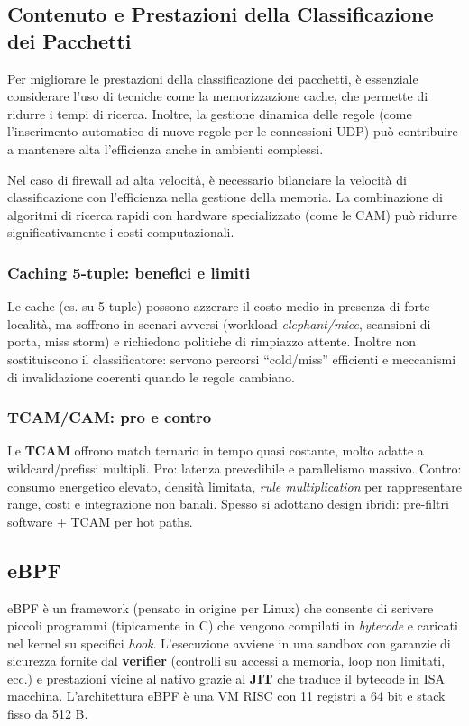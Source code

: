 \subsection{Contenuto e Prestazioni della Classificazione dei Pacchetti}
Per migliorare le prestazioni della classificazione dei pacchetti, è essenziale considerare l'uso di tecniche come la memorizzazione cache, che permette di ridurre i tempi di ricerca. Inoltre, la gestione dinamica delle regole (come l'inserimento automatico di nuove regole per le connessioni UDP) può contribuire a mantenere alta l'efficienza anche in ambienti complessi.

Nel caso di firewall ad alta velocità, è necessario bilanciare la velocità di classificazione con l'efficienza nella gestione della memoria. La combinazione di algoritmi di ricerca rapidi con hardware specializzato (come le CAM) può ridurre significativamente i costi computazionali.

\subsubsection{Caching 5-tuple: benefici e limiti}
Le cache (es. su 5-tuple) possono azzerare il costo medio in presenza di forte località, ma soffrono in scenari avversi (workload \emph{elephant/mice}, scansioni di porta, miss storm) e richiedono politiche di rimpiazzo attente. Inoltre non sostituiscono il classificatore: servono percorsi “cold/miss” efficienti e meccanismi di invalidazione coerenti quando le regole cambiano.

\subsubsection{TCAM/CAM: pro e contro}
Le \textbf{TCAM} offrono match ternario in tempo quasi costante, molto adatte a wildcard/prefissi multipli. Pro: latenza prevedibile e parallelismo massivo. Contro: consumo energetico elevato, densità limitata, \emph{rule multiplication} per rappresentare range, costi e integrazione non banali. Spesso si adottano design ibridi: pre-filtri software + TCAM per hot paths.





\subsection{eBPF}
eBPF è un framework (pensato in origine per Linux) che consente di scrivere piccoli programmi (tipicamente in C) che vengono compilati in \emph{bytecode} e caricati nel kernel su specifici \emph{hook}. L'esecuzione avviene in una sandbox con garanzie di sicurezza fornite dal \textbf{verifier} (controlli su accessi a memoria, loop non limitati, ecc.) e prestazioni vicine al nativo grazie al \textbf{JIT} che traduce il bytecode in ISA macchina. L'architettura eBPF è una VM RISC con 11 registri a 64 bit e stack fisso da 512 B.

